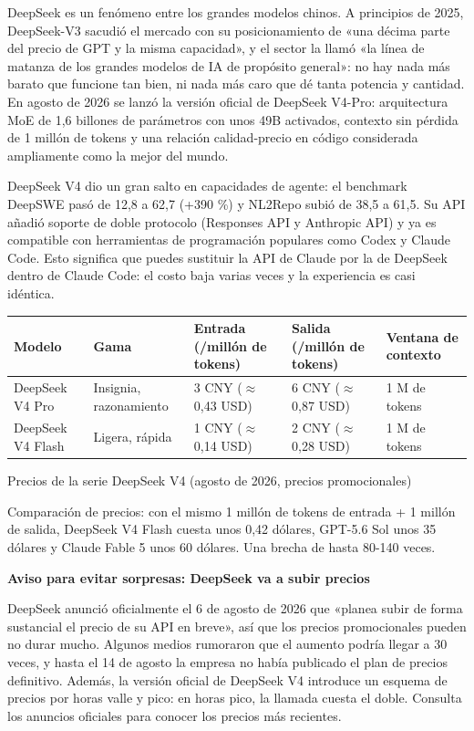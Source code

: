 DeepSeek es un fenómeno entre los grandes modelos chinos. A principios de 2025, DeepSeek-V3 sacudió el mercado con su posicionamiento de «una décima parte del precio de GPT y la misma capacidad», y el sector la llamó «la línea de matanza de los grandes modelos de IA de propósito general»: no hay nada más barato que funcione tan bien, ni nada más caro que dé tanta potencia y cantidad. En agosto de 2026 se lanzó la versión oficial de DeepSeek V4-Pro: arquitectura MoE de 1,6 billones de parámetros con unos 49B activados, contexto sin pérdida de 1 millón de tokens y una relación calidad-precio en código considerada ampliamente como la mejor del mundo.

DeepSeek V4 dio un gran salto en capacidades de agente: el benchmark DeepSWE pasó de 12,8 a 62,7 (+390 \%) y NL2Repo subió de 38,5 a 61,5. Su API añadió soporte de doble protocolo (Responses API y Anthropic API) y ya es compatible con herramientas de programación populares como Codex y Claude Code. Esto significa que puedes sustituir la API de Claude por la de DeepSeek dentro de Claude Code: el costo baja varias veces y la experiencia es casi idéntica.

\begin{center}
\begin{tabularx}{\linewidth}{|X|X|X|X|X|}
\hline
\textbf{Modelo} & \textbf{Gama} & \textbf{Entrada (/millón de tokens)} & \textbf{Salida (/millón de tokens)} & \textbf{Ventana de contexto} \tabularnewline
\hline
DeepSeek V4 Pro & Insignia, razonamiento & 3 CNY ($\approx$0,43 USD) & 6 CNY ($\approx$0,87 USD) & 1 M de tokens \tabularnewline
DeepSeek V4 Flash & Ligera, rápida & 1 CNY ($\approx$0,14 USD) & 2 CNY ($\approx$0,28 USD) & 1 M de tokens \tabularnewline
\hline
\end{tabularx}
\end{center}

\begin{center}\small\color{gray}Precios de la serie DeepSeek V4 (agosto de 2026, precios promocionales)\end{center}

Comparación de precios: con el mismo 1 millón de tokens de entrada + 1 millón de salida, DeepSeek V4 Flash cuesta unos 0,42 dólares, GPT-5.6 Sol unos 35 dólares y Claude Fable 5 unos 60 dólares. Una brecha de hasta 80-140 veces.

\textbf{Aviso para evitar sorpresas: DeepSeek va a subir precios}\par

DeepSeek anunció oficialmente el 6 de agosto de 2026 que «planea subir de forma sustancial el precio de su API en breve», así que los precios promocionales pueden no durar mucho. Algunos medios rumoraron que el aumento podría llegar a 30 veces, y hasta el 14 de agosto la empresa no había publicado el plan de precios definitivo. Además, la versión oficial de DeepSeek V4 introduce un esquema de precios por horas valle y pico: en horas pico, la llamada cuesta el doble. Consulta los anuncios oficiales para conocer los precios más recientes.


